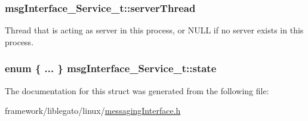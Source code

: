 \subsubsection[{\texorpdfstring{server\+Thread}{serverThread}}]{ msg\+Interface\+\_\+\+Service\+\_\+t\+::server\+Thread}\hypertarget{structmsg_interface___service__t_a0ae89607e7db7ef4a58b4e3973328c32}{}\label{structmsg_interface___service__t_a0ae89607e7db7ef4a58b4e3973328c32}
Thread that is acting as server in this process, or N\+U\+LL if no server exists in this process. 
\subsubsection[{\texorpdfstring{state}{state}}]{\setlength{\rightskip}{0pt plus 5cm}enum \{ ... \} 
     msg\+Interface\+\_\+\+Service\+\_\+t\+::state}\hypertarget{structmsg_interface___service__t_a4bfc3b696b2c37277f13395e49b10868}{}\label{structmsg_interface___service__t_a4bfc3b696b2c37277f13395e49b10868}


The documentation for this struct was generated from the following file\+:\begin{DoxyCompactItemize}
\item 
framework/liblegato/linux/\hyperlink{messaging_interface_8h}{messaging\+Interface.\+h}\end{DoxyCompactItemize}
